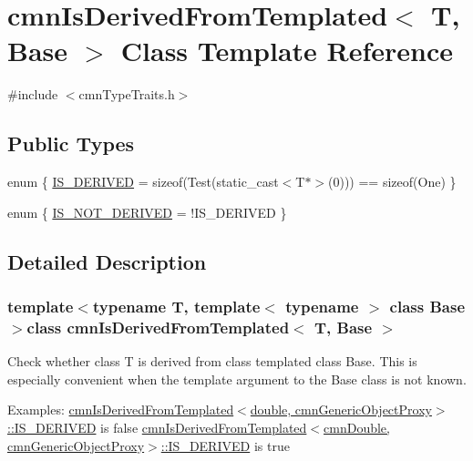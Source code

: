 \hypertarget{classcmn_is_derived_from_templated}{\section{cmn\-Is\-Derived\-From\-Templated$<$ T, Base $>$ Class Template Reference}
\label{classcmn_is_derived_from_templated}
}


{\ttfamily \#include $<$cmn\-Type\-Traits.\-h$>$}

\subsection*{Public Types}
\begin{DoxyCompactItemize}
\item 
enum \{ \hyperlink{classcmn_is_derived_from_templated_adf75555e9b3ea5b7cca26092a9a621bfa946c9ccdd650ead37b23ab1cb284f2ca}{I\-S\-\_\-\-D\-E\-R\-I\-V\-E\-D} = sizeof(Test(static\-\_\-cast$<$T$\ast$$>$(0))) == sizeof(One)
 \}
\item 
enum \{ \hyperlink{classcmn_is_derived_from_templated_aff833aa4b3d8a186921ab9f2ddb20887a762073f61bb9b926aba5b4f227f3e6d8}{I\-S\-\_\-\-N\-O\-T\-\_\-\-D\-E\-R\-I\-V\-E\-D} = !\-I\-S\-\_\-\-D\-E\-R\-I\-V\-E\-D
 \}
\end{DoxyCompactItemize}


\subsection{Detailed Description}
\subsubsection*{template$<$typename T, template$<$ typename $>$ class Base$>$class cmn\-Is\-Derived\-From\-Templated$<$ T, Base $>$}

Check whether class T is derived from class templated class Base. This is especially convenient when the template argument to the Base class is not known.

Examples\-: \hyperlink{classcmn_is_derived_from_templated_adf75555e9b3ea5b7cca26092a9a621bfa946c9ccdd650ead37b23ab1cb284f2ca}{cmn\-Is\-Derived\-From\-Templated$<$double, cmn\-Generic\-Object\-Proxy$>$\-::\-I\-S\-\_\-\-D\-E\-R\-I\-V\-E\-D} is false \hyperlink{classcmn_is_derived_from_templated_adf75555e9b3ea5b7cca26092a9a621bfa946c9ccdd650ead37b23ab1cb284f2ca}{cmn\-Is\-Derived\-From\-Templated$<$cmn\-Double, cmn\-Generic\-Object\-Proxy$>$\-::\-I\-S\-\_\-\-D\-E\-R\-I\-V\-E\-D} is true


